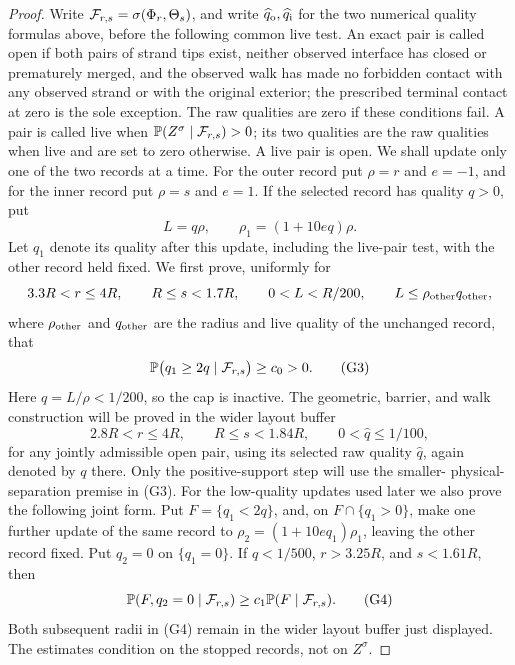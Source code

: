 \begin{proof}
Write \({\cal F}_{r,s}=\sigma(\Phi_r,\Theta_s)\), and write
\(\widehat q_{\rm o},\widehat q_{\rm i}\) for the two numerical quality
formulas above, before the following common live test.  An exact pair is
called open if both pairs of strand tips exist, neither observed interface
has closed or prematurely merged, and the observed walk has made no
forbidden contact with any observed strand or with the original exterior;
the prescribed terminal contact at zero is the sole exception.  The raw
qualities are zero if these conditions fail.  A pair is called live when
\(\mathbb P(Z^\sigma\mid{\cal F}_{r,s})>0\); its two qualities are the raw
qualities when live and are set to zero otherwise.  A live pair is open.
We shall update only one of the two records at a time.
For the outer record put \(\rho=r\) and \(e=-1\), and for the inner
record put \(\rho=s\) and \(e=1\).  If the selected record has quality
\(q>0\), put
\[
       L=q\rho,\qquad \rho_1=(1+10eq)\rho .
\]
Let \(q_1\) denote its quality after this update, including the live-pair
test, with the other record held fixed.  We first prove, uniformly for
\[
 3.3R<r\le4R,\qquad R\le s<1.7R,\qquad
 0<L<R/200,\qquad L\le\rho_{\rm other}q_{\rm other},
\]
where \(\rho_{\rm other}\) and \(q_{\rm other}\) are the radius and
live quality of the unchanged record,
that
\[
 \mathbb P\bigl(q_1\ge2q\mid{\cal F}_{r,s}\bigr)\ge c_0>0.
                                                               \tag{G3}
\]
Here \(q=L/\rho<1/200\), so the cap is inactive.  The geometric,
barrier, and walk construction will be proved in the wider layout buffer
\[
 2.8R<r\le4R,\qquad R\le s<1.84R,\qquad
 0<\widehat q\le1/100,
\]
for any jointly admissible open pair, using its selected raw quality
\(\widehat q\), again denoted by \(q\) there.  Only the positive-support
step will use the smaller-
physical-separation premise in (G3).
For the low-quality updates used later we also prove the following joint
form.  Put \(F=\{q_1<2q\}\), and, on \(F\cap\{q_1>0\}\), make one
further update of the same record to
\(\rho_2=(1+10e q_1)\rho_1\), leaving the other record fixed.  Put
\(q_2=0\) on \(\{q_1=0\}\).  If \(q<1/500\), \(r>3.25R\), and
\(s<1.61R\), then
\[
 \mathbb P(F,q_2=0\mid{\cal F}_{r,s})
       \ge c_1\mathbb P(F\mid{\cal F}_{r,s}).                    \tag{G4}
\]
Both subsequent radii in (G4) remain in the wider layout buffer just
displayed.
The estimates condition on the stopped records, not on \(Z^\sigma\).


\end{proof}
